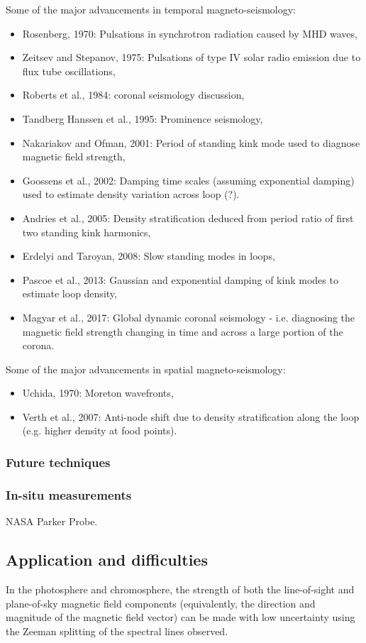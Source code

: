 \documentclass[12pt]{../style-files/ociamthesis}
\begin{document}
Some of the major advancements in temporal magneto-seismology:
\begin{itemize}
	\item Rosenberg, 1970: Pulsations in synchrotron radiation caused by MHD waves,
	\item Zeitsev and Stepanov, 1975: Pulsations of type IV solar radio emission due to flux tube oscillations,
	\item Roberts et al., 1984: coronal seismology discussion,
	\item Tandberg Hanssen et al., 1995: Prominence seismology,
	\item Nakariakov and Ofman, 2001: Period of standing kink mode used to diagnose magnetic field strength,
	\item Goossens et al., 2002: Damping time scales (assuming exponential damping) used to estimate density variation across loop (?).
	\item Andries et al., 2005: Density stratification deduced from period ratio of first two standing kink harmonics,
	\item Erdelyi and Taroyan, 2008: Slow standing modes in loops,
	\item Pascoe et al., 2013: Gaussian and exponential damping of kink modes to estimate loop density,
	\item Magyar et al., 2017: Global dynamic coronal seismology - i.e. diagnosing the magnetic field strength changing in time and across a large portion of the corona.
\end{itemize}
Some of the major advancements in spatial magneto-seismology:
\begin{itemize}
	\item Uchida, 1970: Moreton wavefronts,
	\item Verth et al., 2007: Anti-node shift due to density stratification along the loop (e.g. higher density at food points).
\end{itemize}


\subsubsection{Future techniques}
\subsubsection{In-situ measurements}
NASA Parker Probe.

\subsection{Application and difficulties}
In the photosphere and chromosphere, the strength of both the line-of-sight and plane-of-sky magnetic field components (equivalently, the direction and magnitude of the magnetic field vector) can be made with low uncertainty using the Zeeman splitting of the spectral lines observed.
\end{document}
